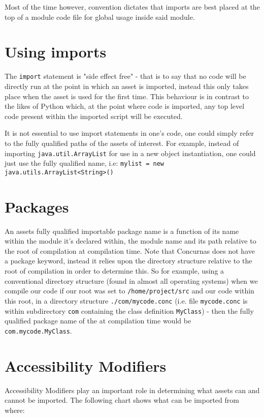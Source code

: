 \documentclass[conc-doc]{subfiles}
\begin{document}
Most of the time however, convention dictates that imports are best placed at the top of a module code file for global usage inside said module.

\section{Using imports}
The \lstinline{import} statement is "side effect free" - that is to say that no code will be directly run at the point in which an asset is imported, instead this only takes place when the asset is used for the first time. This behaviour is in contrast to the likes of Python which, at the point where code is imported, any top level code present within the imported script will be executed.

It is not essential to use import statements in one's code, one could simply refer to the fully qualified paths of the assets of interest. For example, instead of importing \lstinline{java.util.ArrayList} for use in a new object instantiation, one could just use the fully qualified name, i.e: \lstinline{mylist = new java.utils.ArrayList<String>()}

\section{Packages}
An assets fully qualified importable package name is a function of its name within the module it's declared within, the module name and its path relative to the root of compilation at compilation time. Note that Concurnas does not have a package keyword, instead it relies upon the directory structure relative to the root of compilation in order to determine this. So for example, using a conventional directory structure (found in almost all operating systems) when we compile our code if our root was set to \lstinline{/home/project/src} and our code within this root, in a directory structure \lstinline{./com/mycode.conc} (i.e. file \lstinline{mycode.conc} is within subdirectory \lstinline{com} containing the class definition \lstinline{MyClass}) - then the fully qualified package name of the at compilation time would be \lstinline{com.mycode.MyClass}.

\section{Accessibility Modifiers}
Accessibility Modifiers play an important role in determining what assets can and cannot be imported. The following chart shows what can be imported from where:
\end{document}
